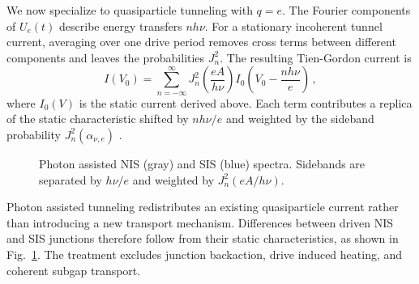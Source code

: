         We now specialize to quasiparticle tunneling with $q=e$. The Fourier components of $U_e(t)$ describe energy transfers $nh\nu$. For a stationary incoherent tunnel current, averaging over one drive period removes cross terms between different components and leaves the probabilities $J_n^2$. The resulting Tien-Gordon current is
        \begin{equation}
            I(V_0)
                = \sum_{n=-\infty}^{\infty}
                    J_n^2\!\left(\frac{eA}{h\nu}\right)
                    I_0\!\left(V_0 - \frac{n h\nu}{e}\right)\,,
            \label{eq:micro:pat-iv}
        \end{equation}
        where $I_0(V)$ is the static current derived above. Each term contributes a replica of the static characteristic shifted by $n h\nu/e$ and weighted by the sideband probability $J_n^2(\alpha_{\nu,e})$ \cite{tien_multiphoton_1963}.

        \begin{figure}[t]
            \centering
            \hfill
            \caption{
                Photon assisted NIS (gray) and SIS (blue) spectra. Sidebands are separated by $h\nu/e$ and weighted by $J_n^2(eA/h\nu)$.
                }
            \label{fig:micro:pat}
        \end{figure}
        
        Photon assisted tunneling redistributes an existing quasiparticle current rather than introducing a new transport mechanism. Differences between driven NIS and SIS junctions therefore follow from their static characteristics, as shown in Fig.~\ref{fig:micro:pat}. The treatment excludes junction backaction, drive induced heating, and coherent subgap transport.
